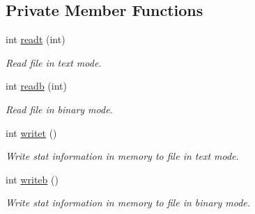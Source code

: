 \subsection*{Private Member Functions}
\begin{DoxyCompactItemize}
\item 
\hypertarget{classmap__file_a06e683db2fe391e33462e15d8f8d4da3}{int \hyperlink{classmap__file_a06e683db2fe391e33462e15d8f8d4da3}{readt} (int)}\label{classmap__file_a06e683db2fe391e33462e15d8f8d4da3}

\begin{DoxyCompactList}\small\item\em Read file in text mode. \end{DoxyCompactList}\item 
\hypertarget{classmap__file_a1c89de1f3e4947dc6e022180e622be20}{int \hyperlink{classmap__file_a1c89de1f3e4947dc6e022180e622be20}{readb} (int)}\label{classmap__file_a1c89de1f3e4947dc6e022180e622be20}

\begin{DoxyCompactList}\small\item\em Read file in binary mode. \end{DoxyCompactList}\item 
\hypertarget{classmap__file_ac9316beee5e9f66a73a9d2fd68ede7ef}{int \hyperlink{classmap__file_ac9316beee5e9f66a73a9d2fd68ede7ef}{writet} ()}\label{classmap__file_ac9316beee5e9f66a73a9d2fd68ede7ef}

\begin{DoxyCompactList}\small\item\em Write stat information in memory to file in text mode. \end{DoxyCompactList}\item 
\hypertarget{classmap__file_ac7b89612f77a8f01de7ddba26d7ad44c}{int \hyperlink{classmap__file_ac7b89612f77a8f01de7ddba26d7ad44c}{writeb} ()}\label{classmap__file_ac7b89612f77a8f01de7ddba26d7ad44c}

\begin{DoxyCompactList}\small\item\em Write stat information in memory to file in binary mode. \end{DoxyCompactList}\end{DoxyCompactItemize}
